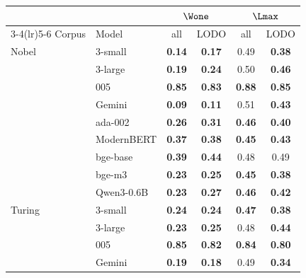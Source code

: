 \begin{table}[htbp]
\centering
\small
\begin{tabular}{llcccc}
\toprule
 & & \multicolumn{2}{c}{$\Wone$} & \multicolumn{2}{c}{$\Lmax$} \\
\cmidrule(lr){3-4}\cmidrule(lr){5-6}
Corpus & Model & all & LODO & all & LODO \\
\midrule
Nobel & 3-small & \cellcolor{tabB!32}\textbf{0.14} & \cellcolor{tabB!29}\textbf{0.17} & 0.49 & \cellcolor{tabB!11}\textbf{0.38} \\
 & 3-large & \cellcolor{tabB!28}\textbf{0.19} & \cellcolor{tabB!24}\textbf{0.24} & 0.50 & \cellcolor{tabB!4}\textbf{0.46} \\
 & 005 & \cellcolor{tabV!32}\textbf{0.85} & \cellcolor{tabV!30}\textbf{0.83} & \cellcolor{tabV!34}\textbf{0.88} & \cellcolor{tabV!31}\textbf{0.85} \\
 & Gemini & \cellcolor{tabB!37}\textbf{0.09} & \cellcolor{tabB!35}\textbf{0.11} & 0.51 & \cellcolor{tabB!6}\textbf{0.43} \\
 & ada-002 & \cellcolor{tabB!21}\textbf{0.26} & \cellcolor{tabB!17}\textbf{0.31} & \cellcolor{tabB!3}\textbf{0.46} & \cellcolor{tabB!9}\textbf{0.40} \\
 & ModernBERT & \cellcolor{tabB!12}\textbf{0.37} & \cellcolor{tabB!10}\textbf{0.38} & \cellcolor{tabB!5}\textbf{0.45} & \cellcolor{tabB!7}\textbf{0.43} \\
 & bge-base & \cellcolor{tabB!10}\textbf{0.39} & \cellcolor{tabB!5}\textbf{0.44} & \cellcolor{tabB!2}0.48 & 0.49 \\
 & bge-m3 & \cellcolor{tabB!25}\textbf{0.23} & \cellcolor{tabB!22}\textbf{0.25} & \cellcolor{tabB!4}\textbf{0.45} & \cellcolor{tabB!11}\textbf{0.38} \\
 & Qwen3-0.6B & \cellcolor{tabB!24}\textbf{0.23} & \cellcolor{tabB!21}\textbf{0.27} & \cellcolor{tabB!3}\textbf{0.46} & \cellcolor{tabB!7}\textbf{0.42} \\
\midrule
Turing & 3-small & \cellcolor{tabB!24}\textbf{0.24} & \cellcolor{tabB!24}\textbf{0.24} & \cellcolor{tabB!3}\textbf{0.47} & \cellcolor{tabB!11}\textbf{0.38} \\
 & 3-large & \cellcolor{tabB!24}\textbf{0.23} & \cellcolor{tabB!23}\textbf{0.25} & \cellcolor{tabB!2}0.48 & \cellcolor{tabB!5}\textbf{0.44} \\
 & 005 & \cellcolor{tabV!31}\textbf{0.85} & \cellcolor{tabV!28}\textbf{0.82} & \cellcolor{tabV!30}\textbf{0.84} & \cellcolor{tabV!27}\textbf{0.80} \\
 & Gemini & \cellcolor{tabB!28}\textbf{0.19} & \cellcolor{tabB!29}\textbf{0.18} & 0.49 & \cellcolor{tabB!14}\textbf{0.34} \\

\end{tabular}
\end{table}
